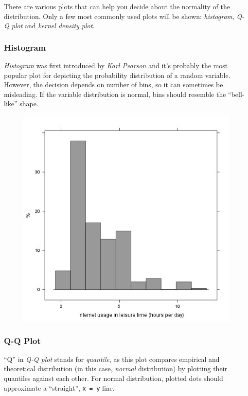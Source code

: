 \documentclass[]{article}
\makeatletter
\def\maxwidth{\ifdim\Gin@nat@width>\linewidth\linewidth
\else\Gin@nat@width\fi}
\let\Oldincludegraphics\includegraphics
\renewcommand{\includegraphics}[1]{\Oldincludegraphics[width=\maxwidth]{#1}}
\makeatother
\begin{document}
There are various plots that can help you decide about the normality of
the distribution. Only a few most commonly used plots will be shown:
\emph{histogram}, \emph{Q-Q plot} and \emph{kernel density plot}.

\subsubsection{Histogram}

\emph{Histogram} was first introduced by \emph{Karl Pearson} and it's
probably the most popular plot for depicting the probability
distribution of a random variable. However, the decision depends on
number of bins, so it can sometimes be misleading. If the variable
distribution is normal, bins should resemble the ``bell-like'' shape.

\begin{figure}[htbp]
\centering
\includegraphics{12bea9ba14449f76d79a9d5792bf29f9.png}
\caption{}
\end{figure}

\subsubsection{Q-Q Plot}

``Q'' in \emph{Q-Q plot} stands for \emph{quantile}, as this plot
compares empirical and theoretical distribution (in this case,
\emph{normal} distribution) by plotting their quantiles against each
other. For normal distribution, plotted dots should approximate a
``straight'', \texttt{x = y} line.
\end{document}
